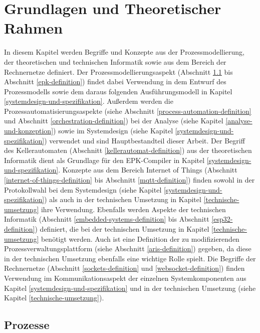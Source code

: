 \chapter{Grundlagen und Theoretischer Rahmen}
\label{grundlagen-und-theoreitscher-rahmen}

In diesem Kapitel werden Begriffe und Konzepte aus der Prozessmodellierung, der theoretischen und technischen Informatik sowie aus dem Bereich der Rechnernetze definiert. Der Prozessmodellierungsaspekt (Abschnitt \ref{prozesse-definition} bis Abschnitt \ref{epk-definition}) findet dabei Verwendung in dem Entwurf des Prozessmodells sowie dem daraus folgenden Ausführungsmodell in Kapitel \ref{systemdesign-und-spezifikation}. Außerdem werden die Prozessautomatisierungsaspekte (siehe Abschnitt \ref{process-automation-definition} und Abschnitt \ref{orchestration-definition}) bei der Analyse (siehe Kapitel \ref{analyse-und-konzeption}) sowie im Systemdesign (siehe Kapitel \ref{systemdesign-und-spezifikation}) verwendet und sind Hauptbestandteil dieser Arbeit. 
Der Begriff des Kellerautomaten (Abschnitt \ref{kellerautomat-definition}) aus der theoretischen Informatik dient als Grundlage für den EPK-Compiler in Kapitel \ref{systemdesign-und-spezifikation}.
Konzepte aus dem Bereich Internet of Things (Abschnitt \ref{internet-of-things-definition} bis Abschnitt \ref{mqtt-definition}) finden sowohl in der Protokollwahl bei dem Systemdesign (siehe Kapitel \ref{systemdesign-und-spezifikation}) als auch in der technischen Umsetzung in Kapitel \ref{technische-umsetzung} ihre Verwendung. 
Ebenfalls werden Aspekte der technischen Informatik (Abschnitt \ref{embedded-systems-definition} bis Abschnitt \ref{esp32-definition}) definiert, die bei der technischen Umsetzung in Kapitel \ref{technische-umsetzung} benötigt werden.
Auch ist eine Definition der zu modifizierenden Prozessverwaltungsplattform (siehe Abschnitt \ref{aris-definition}) gegeben, da diese in der technischen Umsetzung ebenfalls eine wichtige Rolle spielt.
Die Begriffe der Rechnernetze (Abschnitt \ref{sockets-definition} und \ref{websocket-definition}) finden Verwendung im Kommunikationsaspekt der einzelnen Systemkomponenten aus Kapitel \ref{systemdesign-und-spezifikation} und in der technischen Umsetzung (siehe Kapitel \ref{technische-umsetzung}).

\section{Prozesse}
\label{prozesse-definition}

